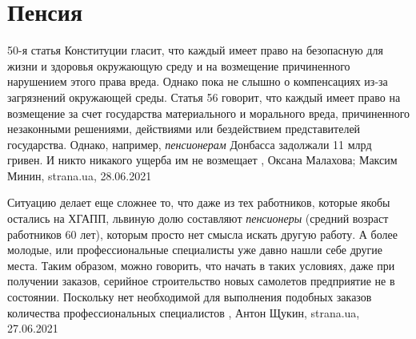  
 
 
 
 
\chapter{Пенсия}

50-я статья Конституции гласит, что каждый имеет право на безопасную для жизни
и здоровья окружающую среду и на возмещение причиненного нарушением этого права
вреда.  Однако пока не слышно о компенсациях из-за загрязнений окружающей
среды.  Статья 56 говорит, что каждый имеет право на возмещение за счет
государства материального и морального вреда, причиненного незаконными
решениями, действиями или бездействием представителей государства.  Однако,
например, \emph{пенсионерам} Донбасса задолжали 11 млрд гривен. И никто
никакого ущерба им не возмещает
, 
Оксана Малахова; Максим Минин, strana.ua, 28.06.2021

Ситуацию делает еще сложнее то, что даже из тех работников, которые якобы
остались на ХГАПП, львиную долю составляют \emph{пенсионеры} (средний возраст
работников 60 лет), которым просто нет смысла искать другую работу. А более
молодые, или профессиональные специалисты уже давно нашли себе другие места.
Таким образом, можно говорить, что начать в таких условиях, даже при получении
заказов, серийное строительство новых самолетов предприятие не в состоянии.
Поскольку нет необходимой для выполнения подобных заказов количества
профессиональных специалистов
, Антон Щукин, strana.ua, 27.06.2021


